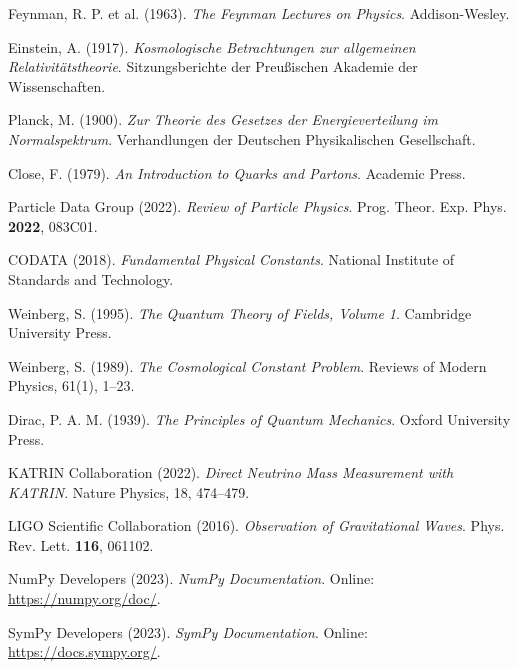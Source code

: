 \documentclass[12pt,a4paper]{article}
\begin{document}
\begin{thebibliography}{20}
	Feynman, R. P. et al. (1963). 
	\textit{The Feynman Lectures on Physics}. 
	Addison-Wesley.
	
	Einstein, A. (1917). 
	\textit{Kosmologische Betrachtungen zur allgemeinen Relativitätstheorie}. 
	Sitzungsberichte der Preußischen Akademie der Wissenschaften.
	
	Planck, M. (1900). 
	\textit{Zur Theorie des Gesetzes der Energieverteilung im Normalspektrum}. 
	Verhandlungen der Deutschen Physikalischen Gesellschaft.
	
	Close, F. (1979). 
	\textit{An Introduction to Quarks and Partons}. 
	Academic Press.
	
	Particle Data Group (2022). 
	\textit{Review of Particle Physics}. 
	Prog. Theor. Exp. Phys. \textbf{2022}, 083C01.
	
	CODATA (2018). 
	\textit{Fundamental Physical Constants}. 
	National Institute of Standards and Technology.
	
	Weinberg, S. (1995). 
	\textit{The Quantum Theory of Fields, Volume 1}. 
	Cambridge University Press.
	
	Weinberg, S. (1989). 
	\textit{The Cosmological Constant Problem}. 
	Reviews of Modern Physics, 61(1), 1--23.
	
	Dirac, P. A. M. (1939). 
	\textit{The Principles of Quantum Mechanics}. 
	Oxford University Press.
	
	KATRIN Collaboration (2022). 
	\textit{Direct Neutrino Mass Measurement with KATRIN}. 
	Nature Physics, 18, 474--479.
	
	LIGO Scientific Collaboration (2016). 
	\textit{Observation of Gravitational Waves}. 
	Phys. Rev. Lett. \textbf{116}, 061102.
	
	NumPy Developers (2023). 
	\textit{NumPy Documentation}. 
	Online: \url{https://numpy.org/doc/}.
	
	SymPy Developers (2023). 
	\textit{SymPy Documentation}. 
	Online: \url{https://docs.sympy.org/}.
	
\end{thebibliography}
\end{document}
